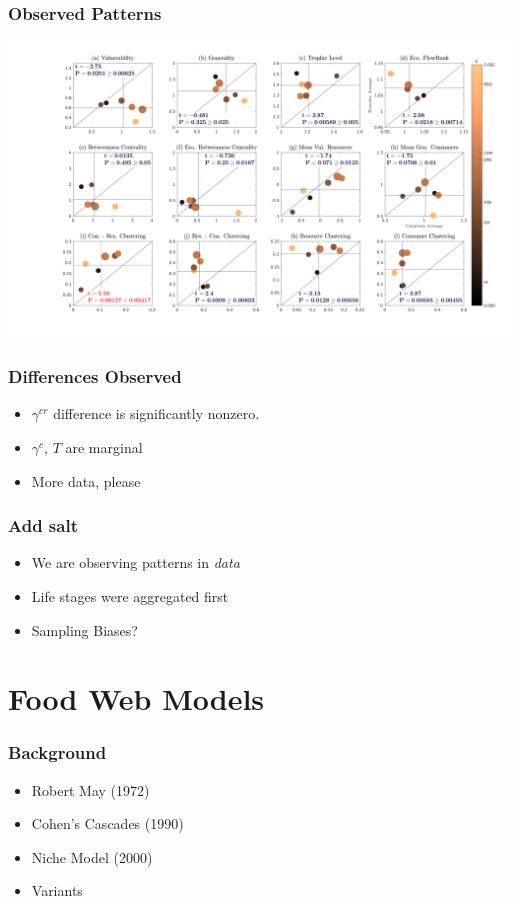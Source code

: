 \documentclass[table]{beamer}
\begin{document}
\begin{frame}
    \frametitle{Observed Patterns}
    \includegraphics[width=\textwidth]{figures/initialPropsMaxLinkage.png}
\end{frame}

\begin{frame}
    \frametitle{Differences Observed}
    \begin{itemize}[<+->]
        \item $\gamma^{cr}$ difference is significantly nonzero.
        \item $\gamma^c$, $T$ are marginal
        \item More data, please
    \end{itemize}
\end{frame}

\begin{frame}
    \frametitle{Add salt}
    \begin{itemize}[<+->]
        \item We are observing patterns in \textit{data} 
        \item Life stages were aggregated first
        \item Sampling Biases?
    \end{itemize}
\end{frame}


\section{Food Web Models}

\begin{frame}
    \frametitle{Background}
    \begin{itemize}[<+->]
        \item Robert May (1972)
        \item Cohen's Cascades (1990)
        \item Niche Model (2000)
        \item Variants 
    \end{itemize}
\end{frame}
\end{document}
